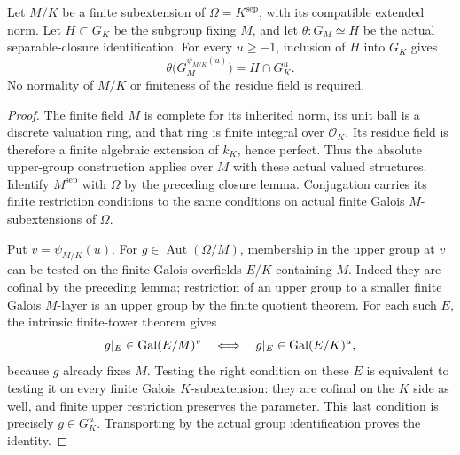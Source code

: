 \begin{proposition}
\label{fw:absolute-finite-base-upper}
\leanok
Let $M/K$ be a finite subextension of $\Omega=K^{\mathrm{sep}}$, with its
compatible extended norm. Let $H\subset G_K$ be the subgroup fixing $M$,
and let $\theta:G_M\simeq H$ be the actual separable-closure identification.
For every $u\geq-1$, inclusion of $H$ into $G_K$ gives
\[
 \theta\bigl(G_M^{\psi_{M/K}(u)}\bigr)=H\cap G_K^u.
\]
No normality of $M/K$ or finiteness of the residue field is required.
\end{proposition}
\begin{proof}
The finite field $M$ is complete for its inherited norm, its unit ball
is a discrete valuation ring, and that ring is finite integral over
$\mathcal O_K$. Its residue field is therefore a finite algebraic
extension of $k_K$, hence perfect. Thus the absolute upper-group
construction applies over $M$ with these actual valued structures.
Identify $M^{\mathrm{sep}}$ with $\Omega$ by the preceding closure lemma.
Conjugation carries its finite restriction conditions to the same
conditions on actual finite Galois $M$-subextensions of $\Omega$.

Put $v=\psi_{M/K}(u)$. For $g\in\operatorname{Aut}(\Omega/M)$, membership
in the upper group at $v$ can be tested on the finite Galois overfields
$E/K$ containing $M$. Indeed they are cofinal by the preceding lemma;
restriction of an upper group to a smaller finite Galois $M$-layer is
an upper group by the finite quotient theorem. For each such $E$, the
intrinsic finite-tower theorem gives
\[
 g|_E\in\operatorname{Gal}(E/M)^v
 \quad\Longleftrightarrow\quad
 g|_E\in\operatorname{Gal}(E/K)^u,
\]
because $g$ already fixes $M$. Testing the right condition on these
$E$ is equivalent to testing it on every finite Galois $K$-subextension:
they are cofinal on the $K$ side as well, and finite upper restriction
preserves the parameter. This last condition is precisely $g\in G_K^u$.
Transporting by the actual group identification proves the identity.
\end{proof}

